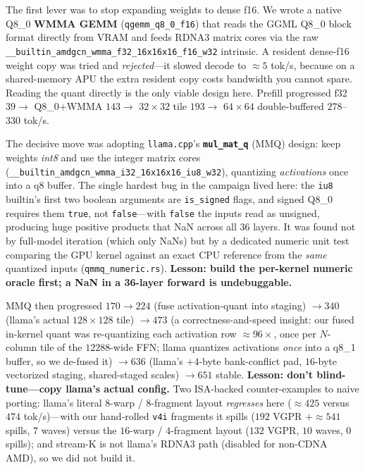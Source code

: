 \documentclass[11pt]{article}
\begin{document}
The first lever was to stop expanding weights to dense f16. We wrote a native Q8\_0 \textbf{WMMA GEMM} (\texttt{qgemm\_q8\_0\_f16}) that reads the GGML Q8\_0 block format directly from VRAM and feeds RDNA3 matrix cores via the raw \texttt{\_\_builtin\_amdgcn\_wmma\_f32\_16x16x16\_f16\_w32} intrinsic. A resident dense-f16 weight copy was tried and \emph{rejected}---it slowed decode to $\approx 5$ tok/s, because on a shared-memory APU the extra resident copy costs bandwidth you cannot spare. Reading the quant directly is the only viable design here. Prefill progressed f32 $39 \to$ Q8\_0+WMMA $143 \to$ $32{\times}32$ tile $193 \to$ $64{\times}64$ double-buffered $278$--$330$ tok/s.

The decisive move was adopting \texttt{llama.cpp}'s \textbf{\texttt{mul\_mat\_q}} (MMQ) design: keep weights \emph{int8} and use the integer matrix cores (\texttt{\_\_builtin\_amdgcn\_wmma\_i32\_16x16x16\_iu8\_w32}), quantizing \emph{activations} once into a q8 buffer. The single hardest bug in the campaign lived here: the \texttt{iu8} builtin's first two boolean arguments are \texttt{is\_signed} flags, and signed Q8\_0 requires them \texttt{true}, not \texttt{false}---with \texttt{false} the inputs read as unsigned, producing huge positive products that NaN across all $36$ layers. It was found not by full-model iteration (which only NaNs) but by a dedicated numeric unit test comparing the GPU kernel against an exact CPU reference from the \emph{same} quantized inputs (\texttt{qmmq\_numeric.rs}). \textbf{Lesson: build the per-kernel numeric oracle first; a NaN in a 36-layer forward is undebuggable.}

MMQ then progressed $170 \to 224$ (fuse activation-quant into staging) $\to 340$ (llama's actual $128{\times}128$ tile) $\to 473$ (a correctness-and-speed insight: our fused in-kernel quant was re-quantizing each activation row $\approx 96\times$, once per $N$-column tile of the $12288$-wide FFN; llama quantizes activations \emph{once} into a q8\_1 buffer, so we de-fused it) $\to 636$ (llama's $+4$-byte bank-conflict pad, $16$-byte vectorized staging, shared-staged scales) $\to 651$ stable. \textbf{Lesson: don't blind-tune---copy llama's actual config.} Two ISA-backed counter-examples to naive porting: llama's literal $8$-warp / $8$-fragment layout \emph{regresses} here ($\approx 425$ versus $474$ tok/s)---with our hand-rolled \texttt{v4i} fragments it spills ($192$ VGPR $+\approx 541$ spills, $7$ waves) versus the $16$-warp / $4$-fragment layout ($132$ VGPR, $10$ waves, $0$ spills); and stream-K is not llama's RDNA3 path (disabled for non-CDNA AMD), so we did not build it.
\end{document}
